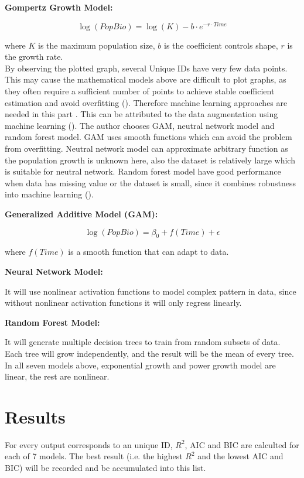 \documentclass[11pt]{article}
\begin{document}
\textbf{Gompertz Growth Model:}

\begin{equation}
\log(PopBio) = \log(K) - b \cdot e^{-r \cdot Time}
\end{equation}

where $K$ is the maximum population size, $b$ is the coefficient controls shape, $r$ is the growth rate.\\

\noindent By observing the plotted graph, several Unique IDs have very few data points. This may cause the mathematical models above are difficult to plot graphs, as they often require a sufficient number of points to achieve stable coefficient estimation and avoid overfitting (\cite{burnham2002model}). Therefore machine learning approaches are needed in this part . This can be attributed to the data augmentation using machine learning (\cite{bishop2006pattern}). The author chooses GAM, neutral network model and random forest model. GAM uses smooth functions which can avoid the problem from overfitting. Neutral network model can approximate arbitrary function as the population growth is unknown here, also the dataset is relatively large which is suitable for neutral network. Random forest model have good performance when data has missing value or the dataset is small, since it combines robustness into machine learning (\cite{lecun2015deep}).

\textbf{Generalized Additive Model (GAM):}

\begin{equation}
\log(PopBio) = \beta_0 + f(Time) + \epsilon
\end{equation}

where $f(Time)$ is a smooth function that can adapt to data.

\textbf{Neural Network Model:}

It will use nonlinear activation functions to model complex pattern in data, since without nonlinear activation functions it will only regress linearly.

\textbf{Random Forest Model:}

It will generate multiple decision trees to train from random subsets of data. Each tree will grow independently, and the result will be the mean of every tree.\\

\noindent In all seven models above, exponential growth and power growth model are linear, the rest are nonlinear. 

\section{Results}
For every output corresponds to an unique ID, $R^2$, AIC and BIC are calculted for each of 7 models. The best result (i.e. the highest $R^2$ and the lowest AIC and BIC) will be recorded and be accumulated into this list.
\end{document}
